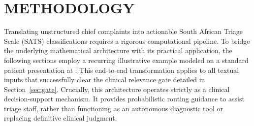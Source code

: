 \chapter{METHODOLOGY}
\label{ch:method}

Translating unstructured chief complaints into actionable South African Triage Scale (SATS) classifications requires a rigorous computational pipeline. To bridge the underlying mathematical architecture with its practical application, the following sections employ a recurring illustrative example modeled on a standard patient presentation at \examplehospital{}: \runningcomplaint{} This end-to-end transformation applies to all textual inputs that successfully clear the clinical relevance gate detailed in Section~\ref{sec:gate}. Crucially, this architecture operates strictly as a clinical decision-support mechanism. It provides probabilistic routing guidance to assist triage staff, rather than functioning as an autonomous diagnostic tool or replacing definitive clinical judgment.



